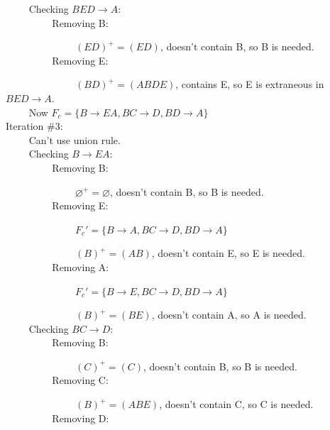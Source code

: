 \documentclass[a4paper]{article}
\begin{document}
	~~~~ Checking $BED\rightarrow A:$ \\
		
	~~~~ ~~~~ Removing B: 
	
	~~~~ ~~~~ ~~~~ $ (ED)^+=(ED) $, doesn't contain B, so B is needed. \\
		
	~~~~ ~~~~ Removing E: 
	
	~~~~ ~~~~ ~~~~ $ (BD)^+=(ABDE) $, contains E, so E is extraneous in $ BED \rightarrow A $. \\
	
	~~~~ Now $F_c = \{B \rightarrow EA, BC \rightarrow D, BD \rightarrow A\}$ \\
	
	Iteration \#3: \\
	
	~~~~ Can't use union rule. \\
	
	~~~~ Checking $B\rightarrow EA:$ \\
		
	~~~~ ~~~~ Removing B: 
	
	~~~~ ~~~~ ~~~~ $ \varnothing^+=\varnothing $, doesn't contain B, so B is needed. \\
		
	~~~~ ~~~~ Removing E: 
	
	~~~~ ~~~~ ~~~~ $ F_c'=\{B\rightarrow A, BC \rightarrow D, BD \rightarrow A\}$ 
	
	~~~~ ~~~~ ~~~~ $ (B)^+=(AB) $, doesn't contain E, so E is needed. \\
		
	~~~~ ~~~~ Removing A: 
	
	~~~~ ~~~~ ~~~~ $ F_c'=\{B\rightarrow E, BC \rightarrow D, BD \rightarrow A\}$ 
	
	~~~~ ~~~~ ~~~~ $ (B)^+=(BE) $, doesn't contain A, so A is needed. \\
		
	~~~~ Checking $BC\rightarrow D:$ \\
		
	~~~~ ~~~~ Removing B: 
	
	~~~~ ~~~~ ~~~~ $ (C)^+=(C) $, doesn't contain B, so B is needed. \\
		
	~~~~ ~~~~ Removing C: 
	
	~~~~ ~~~~ ~~~~ $ (B)^+=(ABE) $, doesn't contain C, so C is needed. \\
		
	~~~~ ~~~~ Removing D: 
	
\end{document}
